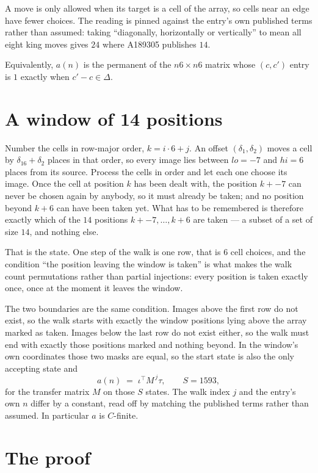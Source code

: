 \documentclass[11pt,a4paper]{article}
\theoremstyle{plain}
\theoremstyle{definition}
\begin{document}
A move is only allowed when its target is a cell of the array, so cells near an
edge have fewer choices. The reading is pinned against the entry's own published terms rather
than assumed: taking ``diagonally, horizontally or vertically'' to mean all eight king moves
gives $24$ where A189305 publishes $14$.

Equivalently, $a(n)$ is the permanent of the $n6\times n6$ matrix whose $(c,c')$ entry is
$1$ exactly when $c'-c\in\Delta$.

\section{A window of 14 positions}

Number the cells in row-major order, $k=i\cdot6+j$. An offset $(\delta_1,\delta_2)$ moves a
cell by $\delta_16+\delta_2$ places in that order, so every image lies between $lo=-7$ and
$hi=6$ places from its source. Process the cells in order and let each one choose its image.
Once the cell at position $k$ has been dealt with, the position $k+-7$ can never be chosen
again by anybody, so it must already be taken; and no position beyond $k+6$ can have been
taken yet. What has to be remembered is therefore exactly which of the $14$ positions
$k+-7,\dots,k+6$ are taken --- a subset of a set of size $14$, and nothing else.

That is the state. One step of the walk is one row, that is $6$ cell choices, and the
condition ``the position leaving the window is taken'' is what makes the walk count permutations
rather than partial injections: every position is taken exactly once, once at the moment it
leaves the window.

The two boundaries are the same condition. Images above the first row do not exist, so the walk
starts with exactly the window positions lying above the array marked as taken. Images below the
last row do not exist either, so the walk must end with exactly those positions marked and
nothing beyond. In the window's own coordinates those two masks are equal, so the start state is
also the only accepting state and
\[
a(n)\;=\;\iota^{\!\top}M^{\,j}\tau ,\qquad S=1593,
\]
for the transfer matrix $M$ on those $S$ states. The walk index $j$ and the entry's own $n$
differ by a constant, read off by matching the published terms rather than assumed. In
particular $a$ is $C$-finite.

\section{The proof}
\end{document}

